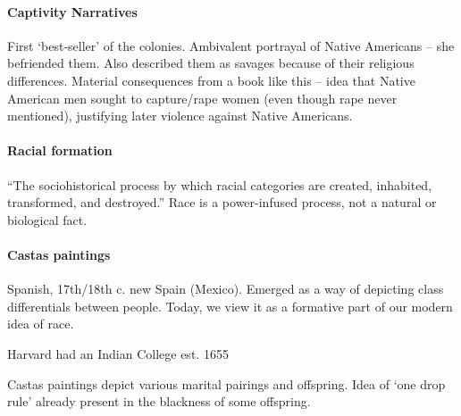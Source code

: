 \paragraph{Captivity Narratives} First `best-seller' of the colonies. Ambivalent portrayal of Native Americans -- she befriended them. Also described them as savages because of their religious differences. Material consequences from a book like this -- idea that Native American men sought to capture/rape women (even though rape never mentioned), justifying later violence against Native Americans.

\paragraph{Racial formation} ``The sociohistorical process by which racial categories are created, inhabited, transformed, and destroyed.'' Race is a power-infused process, not a natural or biological fact. 

\paragraph{Castas paintings} Spanish, 17th/18th c. new Spain (Mexico). Emerged as a way of depicting class differentials between people. Today, we view it as a formative part of our modern idea of race. 

Harvard had an Indian College est. 1655

Castas paintings depict various marital pairings and offspring. Idea of `one drop rule' already present in the blackness of some offspring.